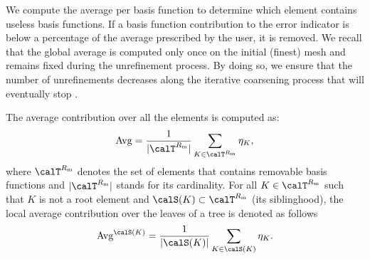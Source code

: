We compute the average per basis function to determine which element contains useless basis functions. If a basis function contribution to the error indicator is below a percentage of the average prescribed by the user, it is removed. We recall that the global average is computed only once on the initial (finest) mesh and remains fixed during the unrefinement process. By doing so, we ensure that the number of unrefinements decreases along the iterative coarsening process that will eventually stop \cite{darrigrand2020painless}.
\begin{defn}
  The average contribution over all the elements is computed as:
  \begin{equation}
    \label{eq:avg}
    \textrm{Avg} = \frac{1}{|\calT^{R_{\textrm{m}}}|}\sum_{K \in \calT^{R_{\textrm{m}}}}\eta_{K},
  \end{equation}
  where $\calT^{R_{\textrm{m}}}$ denotes the set of elements that contains removable basis functions and $|\calT^{R_{\textrm{m}}}|$ stands for its cardinality. For all $K \in \calT^{R_{\textrm{m}}}$ such that $K$ is not a root element and $\calS(K) \subset \calT^{R_{\textrm{m}}}$ (its siblinghood), the local average contribution over the leaves of a tree is denoted as follows
  \begin{equation}
    \label{eq:avglocal}
    \textrm{Avg}^{\calS(K)} = \frac{1}{|\calS(K)|}\sum_{K \in \calS(K)}\eta_{K}.
  \end{equation}
\end{defn}

